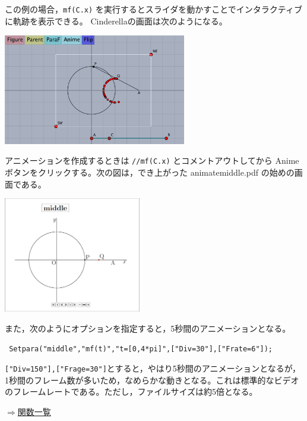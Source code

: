 \documentclass[papersize,a4paper,12pt,uplatex]{jsarticle}
\begin{document}
この例の場合，\verb|mf(C.x)| を実行するとスライダを動かすことでインタラクティブに軌跡を表示できる。
Cinderellaの画面は次のようになる。

\vspace{\baselineskip}
\hspace{20mm} \includegraphics[bb=0.00 0.00 608.03 367.02,width=8cm]{Fig/moviedata01.pdf}

アニメーションを作成するときは \verb|//mf(C.x)| とコメントアウトしてから Anime ボタンをクリックする。次の図は，でき上がった animatemiddle.pdf の始めの画面である。

\hspace{30mm}\includegraphics[bb=0.00 0.00 470.02 394.02,width=6cm]{Fig/moviedata02.pdf}

また，次のようにオプションを指定すると，5秒間のアニメーションとなる。

    \verb| Setpara("middle","mf(t)","t=[0,4*pi]",["Div=30"],["Frate=6"]);|
    
\verb|["Div=150"],["Frage=30"]|とすると，やはり5秒間のアニメーションとなるが，1秒間のフレーム数が多いため，なめらかな動きとなる。これは標準的なビデオのフレームレートである。ただし，ファイルサイズは約5倍となる。


\begin{flushright} \hyperlink{functionlist}{$\Rightarrow$関数一覧}\end{flushright}


\newpage
\end{document}

